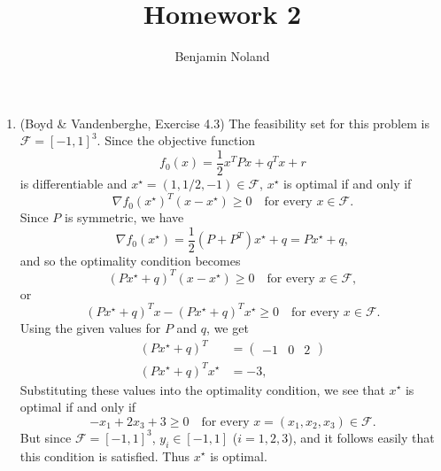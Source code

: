 \documentclass[letterpaper,12pt]{article}
\title{Homework 2}
\author{Benjamin Noland}
\date{}
\begin{document}
\maketitle

\begin{enumerate}
\item (Boyd \& Vandenberghe, Exercise 4.3) The feasibility set for
  this problem is $\mathcal{F} = [-1, 1]^3$. Since the objective
  function
  \begin{equation*}
    f_0(x) = \frac{1}{2} x^T P x + q^T x + r
  \end{equation*}
  is differentiable and $x^\star = (1, 1/2, -1) \in \mathcal{F}$,
  $x^\star$ is optimal if and only if
  \begin{equation*}
    \nabla f_0(x^\star)^T (x - x^\star) \geq 0
      \quad \text{for every $x \in \mathcal{F}$}.
  \end{equation*}
  Since $P$ is symmetric, we have
  \begin{equation*}
    \nabla f_0(x^\star) = \frac{1}{2} (P + P^T) x^\star + q = Px^\star + q,
  \end{equation*}
  and so the optimality condition becomes
  \begin{equation*}
    \left( Px^\star + q \right)^T (x - x^\star) \geq 0
      \quad \text{for every $x \in \mathcal{F}$},
  \end{equation*}
  or
  \begin{equation*}
    \left( Px^\star + q \right)^T x
      - \left( Px^\star + q \right)^T x^\star \geq 0
      \quad \text{for every $x \in \mathcal{F}$}.
  \end{equation*}
  Using the given values for $P$ and $q$, we get
  \begin{align*}
    \left( Px^\star + q \right)^T
      &= \begin{pmatrix}
           -1 & 0 & 2
         \end{pmatrix} \\
    \left( Px^\star + q \right)^T x^\star &= -3,
  \end{align*}
  Substituting these values into the optimality condition, we see that
  $x^\star$ is optimal if and only if
  \begin{equation*}
    -x_1 + 2x_3 + 3 \geq 0
      \quad \text{for every $x = (x_1, x_2, x_3) \in \mathcal{F}$}.
  \end{equation*}
  But since $\mathcal{F} = [-1, 1]^3$, $y_i \in [-1, 1]$
  ($i = 1, 2, 3$), and it follows easily that this condition is
  satisfied. Thus $x^\star$ is optimal.


\end{enumerate}
\end{document}
